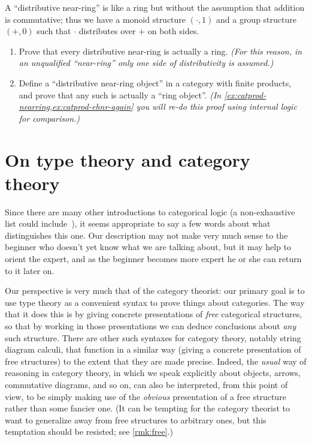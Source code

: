 \begin{ex}\label{ex:near-ring}
  A ``distributive near-ring'' is like a ring but without the assumption that addition is commutative; thus we have a monoid structure $(\cdot,1)$ and a group structure $(+,0)$ such that $\cdot$ distributes over $+$ on both sides.
  \begin{enumerate}
  \item Prove that every distributive near-ring is actually a ring.
    \textit{(For this reason, in an unqualified ``near-ring'' only one side of distributivity is assumed.)}
  \item Define a ``distributive near-ring object'' in a category with finite products, and prove that any such is actually a ``ring object''.
    \textit{(In \cref{ex:catprod-nearring,ex:catprod-ehnr-again} you will re-do this proof using internal logic for comparison.)}
  \end{enumerate}
\end{ex}


\section{On type theory and category theory}
\label{sec:generalities}

Since there are many other introductions to categorical logic (a non-exhaustive list could include~\cite{mr:focl,ls:hocl,jacobs:cltt,goldblatt:topoi,ptj:elephant}), it seems appropriate to say a few words about what distinguishes this one.
Our description may not make very much sense to the beginner who doesn't yet know what we are talking about, but it may help to orient the expert, and as the beginner becomes more expert he or she can return to it later on.

Our perspective is very much that of the category theorist: our primary goal is to use type theory as a convenient syntax to prove things about categories.
The way that it does this is by giving concrete presentations of \emph{free} categorical structures, so that by working in those presentations we can deduce conclusions about \emph{any} such structure.
There are other such syntaxes for category theory, notably string diagram calculi, that function in a similar way (giving a concrete presentation of free structures) to the extent that they are made precise.
Indeed, the \emph{usual} way of reasoning in category theory, in which we speak explicitly about objects, arrows, commutative diagrams, and so on, can also be interpreted, from this point of view, to be simply making use of the \emph{obvious} presentation of a free structure rather than some fancier one.
(It can be tempting for the category theorist to want to generalize away from free structures to arbitrary ones, but this temptation should be resisted; see \cref{rmk:free}.)

